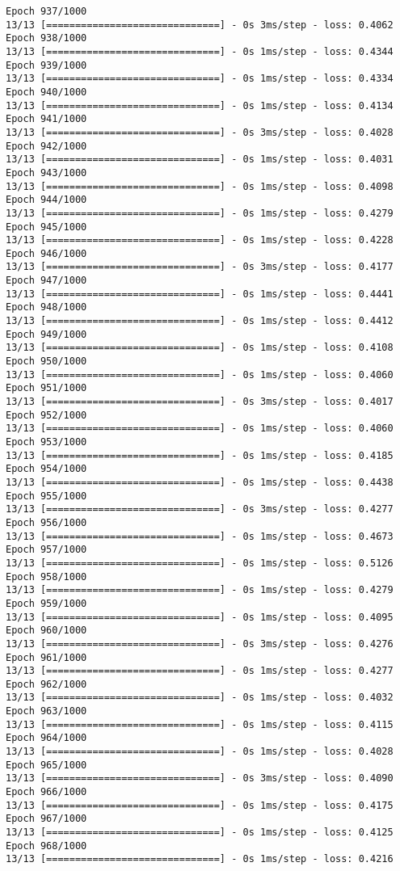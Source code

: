 \documentclass[11pt]{article}
\begin{document}
\begin{Verbatim}[commandchars=\\\{\}]
Epoch 937/1000
13/13 [==============================] - 0s 3ms/step - loss: 0.4062
Epoch 938/1000
13/13 [==============================] - 0s 1ms/step - loss: 0.4344
Epoch 939/1000
13/13 [==============================] - 0s 1ms/step - loss: 0.4334
Epoch 940/1000
13/13 [==============================] - 0s 1ms/step - loss: 0.4134
Epoch 941/1000
13/13 [==============================] - 0s 3ms/step - loss: 0.4028
Epoch 942/1000
13/13 [==============================] - 0s 1ms/step - loss: 0.4031
Epoch 943/1000
13/13 [==============================] - 0s 1ms/step - loss: 0.4098
Epoch 944/1000
13/13 [==============================] - 0s 1ms/step - loss: 0.4279
Epoch 945/1000
13/13 [==============================] - 0s 1ms/step - loss: 0.4228
Epoch 946/1000
13/13 [==============================] - 0s 3ms/step - loss: 0.4177
Epoch 947/1000
13/13 [==============================] - 0s 1ms/step - loss: 0.4441
Epoch 948/1000
13/13 [==============================] - 0s 1ms/step - loss: 0.4412
Epoch 949/1000
13/13 [==============================] - 0s 1ms/step - loss: 0.4108
Epoch 950/1000
13/13 [==============================] - 0s 1ms/step - loss: 0.4060
Epoch 951/1000
13/13 [==============================] - 0s 3ms/step - loss: 0.4017
Epoch 952/1000
13/13 [==============================] - 0s 1ms/step - loss: 0.4060
Epoch 953/1000
13/13 [==============================] - 0s 1ms/step - loss: 0.4185
Epoch 954/1000
13/13 [==============================] - 0s 1ms/step - loss: 0.4438
Epoch 955/1000
13/13 [==============================] - 0s 3ms/step - loss: 0.4277
Epoch 956/1000
13/13 [==============================] - 0s 1ms/step - loss: 0.4673
Epoch 957/1000
13/13 [==============================] - 0s 1ms/step - loss: 0.5126
Epoch 958/1000
13/13 [==============================] - 0s 1ms/step - loss: 0.4279
Epoch 959/1000
13/13 [==============================] - 0s 1ms/step - loss: 0.4095
Epoch 960/1000
13/13 [==============================] - 0s 3ms/step - loss: 0.4276
Epoch 961/1000
13/13 [==============================] - 0s 1ms/step - loss: 0.4277
Epoch 962/1000
13/13 [==============================] - 0s 1ms/step - loss: 0.4032
Epoch 963/1000
13/13 [==============================] - 0s 1ms/step - loss: 0.4115
Epoch 964/1000
13/13 [==============================] - 0s 1ms/step - loss: 0.4028
Epoch 965/1000
13/13 [==============================] - 0s 3ms/step - loss: 0.4090
Epoch 966/1000
13/13 [==============================] - 0s 1ms/step - loss: 0.4175
Epoch 967/1000
13/13 [==============================] - 0s 1ms/step - loss: 0.4125
Epoch 968/1000
13/13 [==============================] - 0s 1ms/step - loss: 0.4216

\end{Verbatim}
\end{document}
